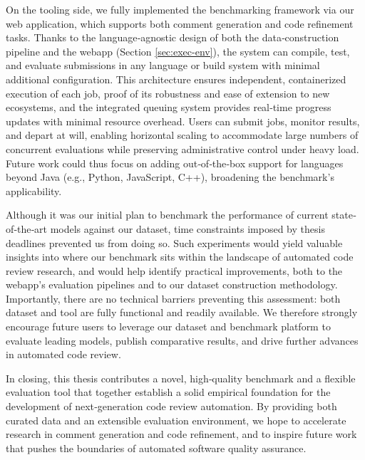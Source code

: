 On the tooling side, we fully implemented the benchmarking framework via our web application, which
supports both comment generation and code refinement tasks.  Thanks to the language‐agnostic design
of both the data‐construction pipeline and the webapp (Section \ref{sec:exec-env}), the system can
compile, test, and evaluate submissions in any language or build system with minimal additional
configuration.  This architecture ensures independent, containerized execution of each job, proof of
its robustness and ease of extension to new ecosystems, and the integrated queuing system provides
real‐time progress updates with minimal resource overhead.  Users can submit jobs, monitor results,
and depart at will, enabling horizontal scaling to accommodate large numbers of concurrent
evaluations while preserving administrative control under heavy load.  Future work could thus focus
on adding out‐of‐the‐box support for languages beyond Java (e.g., Python, JavaScript, C++),
broadening the benchmark's applicability.

Although it was our initial plan to benchmark the performance of current state‐of‐the‐art models
against our dataset, time constraints imposed by thesis deadlines prevented us from doing so. Such
experiments would yield valuable insights into where our benchmark sits within the landscape of
automated code review research, and would help identify practical improvements, both to the webapp's
evaluation pipelines and to our dataset construction methodology. Importantly, there are no
technical barriers preventing this assessment: both dataset and tool are fully functional and
readily available. We therefore strongly encourage future users to leverage our dataset and
benchmark platform to evaluate leading models, publish comparative results, and drive further
advances in automated code review.

In closing, this thesis contributes a novel, high‐quality benchmark and a flexible evaluation tool
that together establish a solid empirical foundation for the development of next‐generation code
review automation. By providing both curated data and an extensible evaluation environment, we hope
to accelerate research in comment generation and code refinement, and to inspire future work that
pushes the boundaries of automated software quality assurance.
